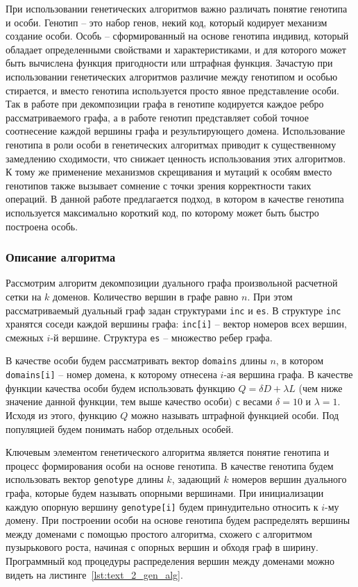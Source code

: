 При использовании генетических алгоритмов важно различать понятие генотипа и особи.
Генотип – это набор генов, некий код, который кодирует механизм создание особи.
Особь – сформированный на основе генотипа индивид, который обладает определенными свойствами и характеристиками, и для которого может быть вычислена функция пригодности или штрафная функция.
Зачастую при использовании генетических алгоритмов различие между генотипом и особью стирается, и вместо генотипа используется просто явное представление особи.
Так в работе \cite{Chaouche2023Graph} при декомпозиции графа в генотипе кодируется каждое ребро рассматриваемого графа, а в работе \cite{Li2020Graph} генотип представляет собой точное соотнесение каждой вершины графа и результирующего домена.
Использование генотипа в роли особи в генетических алгоритмах приводит к существенному замедлению сходимости, что снижает ценность использования этих алгоритмов.
К тому же применение механизмов скрещивания и мутаций к особям вместо генотипов также вызывает сомнение с точки зрения корректности таких операций. В данной работе предлагается подход, в котором в качестве генотипа используется максимально короткий код, по которому может быть быстро построена особь.

\subsubsection{Описание алгоритма}

Рассмотрим алгоритм декомпозиции дуального графа произвольной расчетной сетки на $k$ доменов.
Количество вершин в графе равно $n$.
При этом рассматриваемый дуальный граф задан структурами \texttt{inc} и \texttt{es}.
В структуре \texttt{inc} хранятся соседи каждой вершины графа: \texttt{inc[i]} -- вектор номеров всех вершин, смежных $i$-й вершине.
Структура \texttt{es} -- множество ребер графа.

В качестве особи будем рассматривать вектор \texttt{domains} длины $n$, в котором \texttt{domains[i]} -- номер домена, к которому отнесена $i$-ая вершина графа.
В качестве функции качества особи будем использовать функцию $Q = \delta D + \lambda L$ (чем ниже значение данной функции, тем выше качество особи) с весами $\delta = 10$ и $\lambda = 1$.
Исходя из этого, функцию $Q$ можно называть штрафной функцией особи.
Под популяцией будем понимать набор отдельных особей.

Ключевым элементом генетического алгоритма является понятие генотипа и процесс формирования особи на основе генотипа.
В качестве генотипа будем использовать вектор \texttt{genotype} длины $k$, задающий $k$ номеров вершин дуального графа, которые будем называть опорными вершинами.
При инициализации каждую опорную вершину \texttt{genotype[i]} будем принудительно относить к $i$-му домену.
При построении особи на основе генотипа будем распределять вершины между доменами с помощью простого алгоритма, схожего с алгоритмом пузырькового роста, начиная с опорных вершин и обходя граф в ширину.
Программный код процедуры распределения вершин между доменами можно видеть на листинге~\ref{lst:text_2_gen_alg}.

